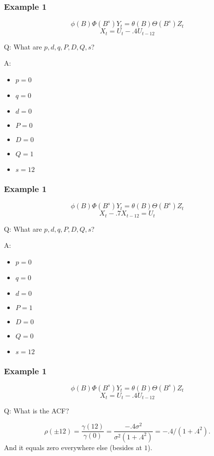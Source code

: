 \documentclass{beamer}
\begin{document}

\begin{frame}
\frametitle{Example 1}
\[
\phi(B)\Phi(B^s)Y_t = \theta(B) \Theta(B^s)Z_t
\]
\[
X_t = U_t - .4 U_{t-12}
\]

Q: What are $p,d,q,P,D,Q,s$?
\newline
\pause

A: 
\begin{itemize}
\item $p=0$
\item $q=0$
\item $d=0$
\item $P=0$
\item $D=0$
\item $Q=1$
\item $s=12$
\end{itemize}

\end{frame}


\begin{frame}
\frametitle{Example 1}
\[
\phi(B)\Phi(B^s)Y_t = \theta(B) \Theta(B^s)Z_t
\]
\[
X_t - .7 X_{t-12} = U_t
\]

Q: What are $p,d,q,P,D,Q,s$?
\newline
\pause

A: 
\begin{itemize}
\item $p=0$
\item $q=0$
\item $d=0$
\item $P=1$
\item $D=0$
\item $Q=0$
\item $s=12$
\end{itemize}

\end{frame}


\begin{frame}
\frametitle{Example 1}
\[
\phi(B)\Phi(B^s)Y_t = \theta(B) \Theta(B^s)Z_t
\]
\[
X_t = U_t - .4 U_{t-12}
\]

Q: What is the ACF?
\newline
\pause

\[
\rho(\pm 12) = \frac{ \gamma(12) }{\gamma(0) } = \frac{-.4 \sigma^2 }{\sigma^2(1 + .4^2) } = -.4/(1+.4^2).
\]
And it equals zero everywhere else (besides at $1$).

\end{frame}
\end{document}
